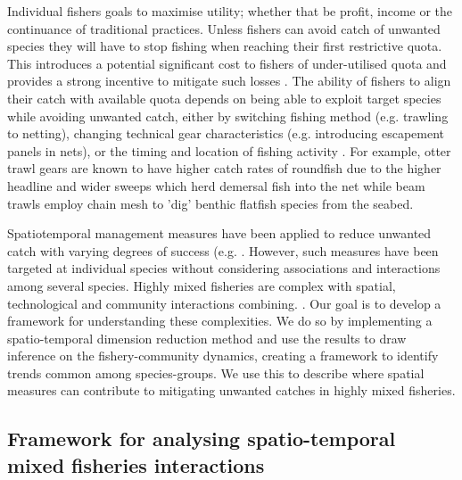 \documentclass{nature}
\begin{document}
 Individual fishers goals to maximise
utility; whether that be profit, income or the continuance of traditional
practices.   Unless fishers can avoid catch of
unwanted species they will have to stop fishing when reaching their first
restrictive quota. This introduces a potential significant cost to fishers of
under-utilised quota\cite{Ulrich2016} and provides a strong
incentive to mitigate such losses \cite{Condie2013}. The ability
of fishers to align their catch with available quota depends on being able to
exploit target species while avoiding unwanted catch, either by switching
fishing method (e.g.  trawling to netting), changing technical gear
characteristics (e.g.  introducing escapement panels in nets), or the timing
and location of fishing activity \cite{vanPutten2012a}. For
example, otter trawl gears are known to have higher catch rates of roundfish
due to the higher headline and wider sweeps which herd demersal fish into the
net while beam trawls employ chain mesh to 'dig' benthic flatfish species from
the seabed\cite{Fraser2008}.

Spatiotemporal management measures  have been applied to reduce unwanted catch with varying
degrees of success (e.g.  \cite{Needle2011, Dunn2014a}.  However, such measures
have  been targeted at individual species without considering
associations and interactions among several species. Highly mixed fisheries are
complex with spatial, technological and community interactions combining.
.  Our goal is to develop a framework
for understanding these complexities. We do so by implementing a
spatio-temporal dimension reduction method and use the results to draw
inference on the fishery-community dynamics, creating a framework to identify
trends common among species-groups. We use this to describe where spatial
measures can contribute to mitigating unwanted catches in highly mixed
fisheries.


\subsection{Framework for analysing spatio-temporal mixed fisheries
	interactions}
\end{document}

